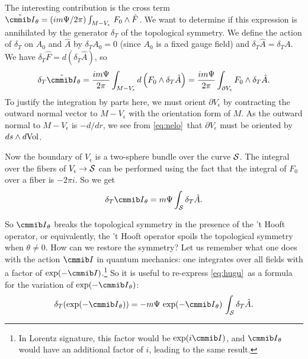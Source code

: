The interesting contribution is the cross term $\tilde {\cmmib
I}_\theta =(im\Psi/2\pi)\int_{M-V_\epsilon}\,F_0\wedge \hat F$. We
want to determine if this expression is annihilated by the
generator $\delta_T$ of the topological symmetry. We define the
action of $\delta_T$ on $A_0$ and $\hat A$ by $\delta_T A_0=0 $
(since $A_0$ is a fixed gauge field) and $\delta_T\hat
A=\delta_TA$. We have $\delta_T \hat F=d (\delta_T\hat A)$, so
\setcounter{equation}{12}
\begin{equation}\label{eq:juqu}
\delta_T\tilde {{\cmmib I}}_\theta={im\Psi\over
2\pi}\int_{M-V_{\epsilon}}d\left(F_0\wedge \delta_T\hat
A\right)={im\Psi\over 2\pi}\int_{\partial V_\epsilon} F_0\wedge
\delta_T\hat A.
\end{equation}
 To justify the integration by parts here, we must
orient $\partial V_\epsilon$ by contracting the outward normal
vector to $M-V_\epsilon$ with the orientation form of $M$. As the
outward normal to $M-V_\epsilon$ is $-d/dr$, we see from \eqref{eq:nelo}\
that $\partial V_\epsilon$ must be oriented by $ds\wedge d{\rm
Vol}$.

Now the boundary of $V_\epsilon$ is a two-sphere bundle over the
curve ${{\cal S}}$.  The integral over the fibers of
$V_\epsilon\to {{\cal S}}$ can be performed using the fact that
the integral of $F_0$ over a fiber is $-2\pi i$.   So we get
\setcounter{equation}{13}
\begin{equation}\label{eq:hugu}
\delta_T {{\cmmib I}}_\theta=m\Psi \int_{{\cal
S}}\delta_T \hat A.
\end{equation}

So ${{\cmmib I}}_\theta$ breaks the topological symmetry in the
presence of the 't Hooft operator, or equivalently, the 't Hooft
operator spoils the topological symmetry when $\theta\not= 0$. How
can we restore the symmetry? Let us remember what one does with
the action ${{\cmmib I}}$ in quantum mechanics: one integrates
over all fields with a factor of $\exp(-{{\cmmib I}})$.\footnote{In
Lorentz signature, this factor would be $\exp(i{{\cmmib I}})$, and
${{{\cmmib I}}}_\theta$ would have an additional factor of $i$,
leading to the same result.}  So it is useful to re-express \eqref{eq:hugu}\
as a formula for the variation of $\exp(-{{\cmmib I}}_\theta)$:
\setcounter{equation}{14}
\begin{equation}\label{eq:jugu}
\delta_T(\exp(-{{\cmmib
I}}_\theta))=-m\Psi\,\exp(-{{\cmmib I}}_\theta)\, \int_{{\cal S}}
\delta_T\hat A.
\end{equation}

